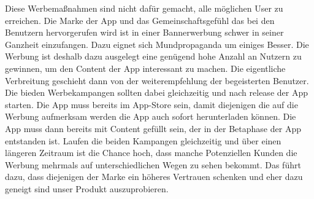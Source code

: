 Diese Werbemaßnahmen sind nicht dafür gemacht, alle möglichen User zu erreichen. Die Marke der App und das Gemeinschaftsgefühl das bei den Benutzern hervorgerufen wird ist in einer Bannerwerbung schwer in seiner Ganzheit einzufangen. Dazu eignet sich Mundpropaganda um einiges Besser. Die Werbung ist deshalb dazu ausgelegt eine genügend hohe Anzahl an Nutzern zu gewinnen, um den Content der App interessant zu machen. Die eigentliche Verbreitung geschieht dann von der weiterempfehlung der begeisterten Benutzer.
Die bieden Werbekampangen sollten dabei gleichzeitig und nach release der App starten. Die App muss bereits im App-Store sein, damit diejenigen die auf die Werbung aufmerksam werden die App auch sofort herunterladen können. Die App muss dann bereits mit Content gefüllt sein, der in der Betaphase der App entstanden ist. Laufen die beiden Kampangen gleichzeitig und über einen längeren Zeitraum ist die Chance hoch, dass manche Potenziellen Kunden die Werbung mehrmals auf unterschiedlichen Wegen zu sehen bekommt. Das führt dazu, dass diejenigen der Marke ein höheres Vertrauen schenken und eher dazu geneigt sind unser Produkt auszuprobieren.